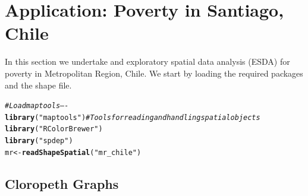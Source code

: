 \documentclass[english,12pt]{book}\usepackage[]{graphicx}\usepackage[]{xcolor}
\makeatletter
\newcommand{\hlstr}[1]{\textcolor[rgb]{0.192,0.494,0.8}{#1}}%
\newcommand{\hlcom}[1]{\textcolor[rgb]{0.678,0.584,0.686}{\textit{#1}}}%
\newcommand{\hlstd}[1]{\textcolor[rgb]{0.345,0.345,0.345}{#1}}%
\newcommand{\hlkwb}[1]{\textcolor[rgb]{0.69,0.353,0.396}{#1}}%
\newcommand{\hlkwd}[1]{\textcolor[rgb]{0.737,0.353,0.396}{\textbf{#1}}}%
\newenvironment{kframe}{%
 \def\at@end@of@kframe{}%
 \ifinner\ifhmode%
  \def\at@end@of@kframe{\end{minipage}}%
  \begin{minipage}{\columnwidth}%
 \fi\fi%
 \def\FrameCommand##1{\hskip\@totalleftmargin \hskip-\fboxsep
 \colorbox{shadecolor}{##1}\hskip-\fboxsep
     \hskip-\linewidth \hskip-\@totalleftmargin \hskip\columnwidth}%
 \MakeFramed {\advance\hsize-\width
   \@totalleftmargin\z@ \linewidth\hsize
   \@setminipage}}%
 {\par\unskip\endMakeFramed%
 \at@end@of@kframe}
\newenvironment{knitrout}{}{} %
\makeatother
\begin{document}



\section{Application: Poverty in Santiago, Chile}

In this section we undertake and exploratory spatial data analysis (ESDA) for poverty in Metropolitan Region, Chile.  We start by loading the required packages and the shape file. 

\begin{knitrout}
\color{fgcolor}\begin{kframe}
\begin{alltt}
\hlcom{# Load maptools ----}
\hlkwd{library}\hlstd{(}\hlstr{"maptools"}\hlstd{)} \hlcom{# Tools for reading and handling spatial objects}
\hlkwd{library}\hlstd{(}\hlstr{"RColorBrewer"}\hlstd{)}
\hlkwd{library}\hlstd{(}\hlstr{"spdep"}\hlstd{)}
\hlstd{mr} \hlkwb{<-} \hlkwd{readShapeSpatial}\hlstd{(}\hlstr{"mr_chile"}\hlstd{)}
\end{alltt}
\end{kframe}
\end{knitrout}

\subsection{Cloropeth Graphs}
\end{document}
